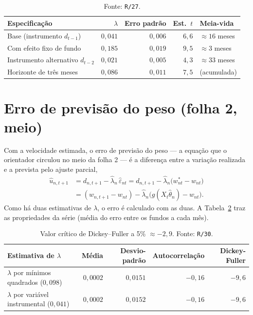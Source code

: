 \documentclass[11pt,a4paper]{article}
\begin{document}
\begin{table}[h]\centering\small
\caption{Robustez de $\lambda$ (variável instrumental; erro-padrão agrupado por fundo).}
\label{tab:rob}
\begin{tabular}{@{}lrrrl@{}}
\toprule
Especificação & $\widehat{\lambda}$ & Erro padrão & Est.\ $t$ & Meia-vida \\
\midrule
Base (instrumento $d_{t-1}$)               & $0{,}041$ & $0{,}006$ & $6{,}6$ & $\approx16$ meses \\
Com efeito fixo de fundo                   & $0{,}185$ & $0{,}019$ & $9{,}5$ & $\approx3$ meses \\
Instrumento alternativo $d_{t-2}$          & $0{,}021$ & $0{,}005$ & $4{,}3$ & $\approx33$ meses \\
Horizonte de três meses                    & $0{,}086$ & $0{,}011$ & $7{,}5$ & (acumulada) \\
\bottomrule
\end{tabular}
\caption*{\footnotesize Fonte: \texttt{R/27}.}
\end{table}

\section{Erro de previsão do peso (folha 2, meio)}

Com a velocidade estimada, o erro de previsão do peso --- a equação que o orientador circulou no meio
da folha 2 --- é a diferença entre a variação realizada e a prevista pelo ajuste parcial,
\begin{align}
\widehat{u}_{n,t+1} &= d_{n,t+1} - \widehat{\lambda}_n\,\widehat{\varepsilon}_{nt}
= d_{n,t+1} - \widehat{\lambda}_n\big(w^{*}_{nt}-w_{nt}\big) \nonumber\\
&= (w_{n,t+1}-w_{nt}) - \widehat{\lambda}_n\big(g(X_t\widehat{\theta}_n)-w_{nt}\big).
\label{eq:u}
\end{align}
Como há duas estimativas de $\lambda$, o erro é calculado com as duas. A
Tabela~\ref{tab:userie} traz as propriedades da série (média do erro entre os fundos a cada mês).

\begin{table}[h]\centering\small
\caption{Propriedades da série do erro $\widehat u_{n,t+1}$ (média por mês).}
\label{tab:userie}
\begin{tabular}{@{}lrrrr@{}}
\toprule
Estimativa de $\lambda$ & Média & Desvio-padrão & Autocorrelação & Dickey-Fuller \\
\midrule
$\lambda$ por mínimos quadrados ($0{,}098$)   & $0{,}0002$ & $0{,}0151$ & $-0{,}16$ & $-9{,}6$ \\
$\lambda$ por variável instrumental ($0{,}041$) & $0{,}0002$ & $0{,}0152$ & $-0{,}16$ & $-9{,}6$ \\
\bottomrule
\end{tabular}
\caption*{\footnotesize Valor crítico de Dickey--Fuller a 5\% $\approx -2{,}9$. Fonte: \texttt{R/30}.}
\end{table}
\end{document}
